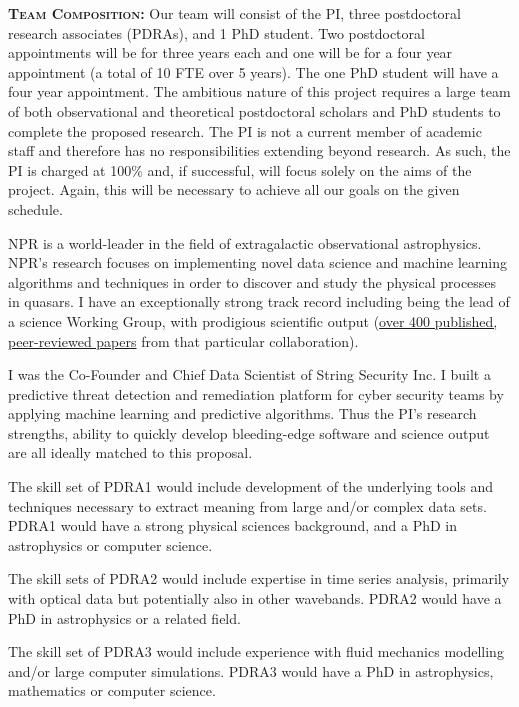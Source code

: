 \smallskip
\smallskip
\noindent
\textbf{\textsc{Team Composition:}}
Our team will consist of the PI, three postdoctoral research
associates (PDRAs), and 1 PhD student.  Two postdoctoral appointments
will be for three years each and one will be for a four year
appointment (a total of 10 FTE over 5 years).  The one PhD student
will have a four year appointment.  The ambitious nature of this
project requires a large team of both observational and theoretical
postdoctoral scholars and PhD students to complete the proposed
research.  The PI is not a current member of academic staff and
therefore has no responsibilities extending beyond research.  As such,
the PI is charged at 100\% and, if successful, will focus solely on
the aims of the project.  Again, this will be necessary to achieve all
our goals on the given schedule.

\smallskip
\smallskip
\noindent
NPR is a world-leader in the field of extragalactic observational
astrophysics. NPR's research focuses on implementing novel data
science and machine learning algorithms and techniques in order to
discover and study the physical processes in quasars. I have an
exceptionally strong track record including being the lead of a
science Working Group, with prodigious scientific output
(\href{https://tinyurl.com/ycxd8lb6}{over 400 published, peer-reviewed
papers} from that particular collaboration).

\smallskip
\smallskip
\noindent
I was the Co-Founder and Chief Data Scientist of String Security
Inc. I built a predictive threat detection and remediation
platform for cyber security teams by applying machine learning and
predictive algorithms.  Thus the PI's research strengths, ability to
quickly develop bleeding-edge software and science output are all
ideally matched to this proposal.

\smallskip
\smallskip
\noindent
The skill set of PDRA1 would include development of the underlying
tools and techniques necessary to extract meaning from large and/or
complex data sets.  PDRA1 would have a strong physical sciences
background, and a PhD in astrophysics or computer science.

\smallskip
\smallskip
\noindent
The skill sets of PDRA2 would include expertise in time series
analysis, primarily with optical data but potentially also in other
wavebands.  PDRA2 would have a PhD in astrophysics or a related field.

\smallskip
\smallskip
\noindent
The skill set of PDRA3 would include experience with fluid mechanics
modelling and/or large computer simulations.  PDRA3 would have a PhD in astrophysics,
mathematics or computer science.

